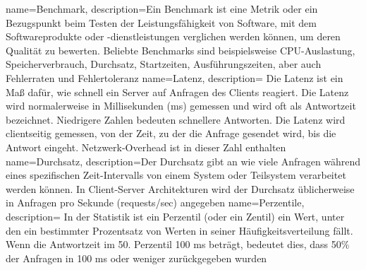 {
  name=Benchmark,
  description={Ein Benchmark ist eine Metrik oder ein Bezugspunkt beim Testen der Leistungsfähigkeit von Software,
      mit dem Softwareprodukte oder -dienstleistungen verglichen werden können, um deren Qualität zu bewerten.
      Beliebte Benchmarks sind beispielsweise CPU-Auslastung, Speicherverbrauch, Durchsatz, Startzeiten, Ausführungszeiten,
      aber auch Fehlerraten und Fehlertoleranz}
}
{
  name=Latenz,
  description={
      Die Latenz ist ein Maß dafür, wie schnell ein Server auf Anfragen des Clients reagiert.
      Die Latenz wird normalerweise in Millisekunden (ms) gemessen und wird oft als Antwortzeit bezeichnet.
      Niedrigere Zahlen bedeuten schnellere Antworten. Die Latenz wird clientseitig gemessen, von der
      Zeit, zu der die Anfrage gesendet wird, bis die Antwort eingeht. Netzwerk-Overhead ist in dieser Zahl enthalten}
}
{
  name=Durchsatz,
  description={Der Durchsatz gibt an wie viele Anfragen während eines spezifischen Zeit-Intervalls von einem System oder Teilsystem
      verarbeitet werden können. In Client-Server Architekturen wird der Durchsatz üblicherweise
      in Anfragen pro Sekunde (requests/sec) angegeben}
}
{
  name=Perzentile,
  description=
    {In der Statistik ist ein Perzentil (oder ein Zentil) ein Wert, unter den ein bestimmter Prozentsatz von Werten in seiner Häufigkeitsverteilung fällt.
      Wenn die Antwortzeit im 50. Perzentil 100 ms beträgt, bedeutet dies, dass 50\% der Anfragen in 100 ms oder weniger zurückgegeben wurden}
}
